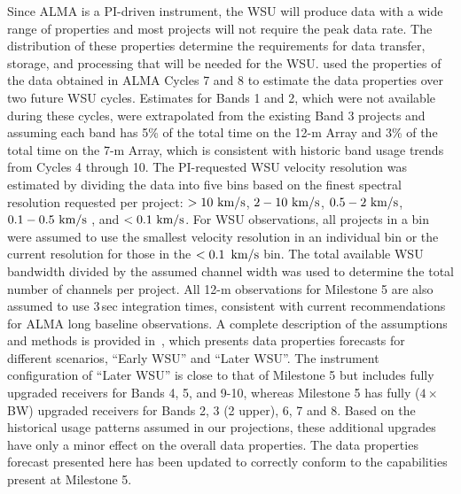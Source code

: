 Since ALMA is a PI-driven instrument, the WSU will produce data with a wide range of properties and most projects will not require the peak data rate. The distribution of these properties determine the requirements for data transfer, storage, and processing that will be needed for the WSU. \cite{drru_mean} used the properties of the data obtained in ALMA Cycles 7 and 8 to estimate the data properties over two future WSU cycles. Estimates for Bands 1 and 2, which were not available during these cycles, were extrapolated from the existing Band 3 projects and assuming each band has 5\% of the total time on the 12-m Array and 3\% of the total time on the 7-m Array, which is consistent with historic band usage trends from Cycles 4 through 10.
The PI-requested WSU velocity resolution was estimated by dividing the data into five bins based on the finest spectral resolution requested per project: $> 10~\mbox{km/s}$,  $2-10 ~\mbox{km/s}$, $0.5-2 ~\mbox{km/s}$,  $0.1-0.5 ~\mbox{km/s}$ , and $<0.1 ~\mbox{km/s}$. For WSU observations, all projects in a bin were assumed to use the smallest velocity resolution in an individual bin or the current resolution for those in the $<0.1\,~\mbox{km/s}$ bin. The total available WSU bandwidth divided by the assumed channel width was used to determine the total number of channels per project. All 12-m observations for Milestone 5 are also assumed to use 3\,sec integration times, consistent with current recommendations for ALMA long baseline observations.
A complete description of the assumptions and methods is provided in~\cite{drru_mean}, which presents data properties forecasts for different scenarios, ``Early WSU'' and ``Later WSU''. The instrument configuration of ``Later WSU'' is close to that of Milestone 5 but includes fully upgraded receivers for Bands 4, 5, and 9-10, whereas Milestone 5 has fully ($4\times$ BW) upgraded receivers for Bands 2, 3 (2 upper), 6, 7 and 8.  Based on the historical usage patterns assumed in our projections, these additional upgrades have only a minor effect on the overall data properties. The data properties forecast presented here has been updated to correctly  conform to the capabilities present at Milestone 5.

